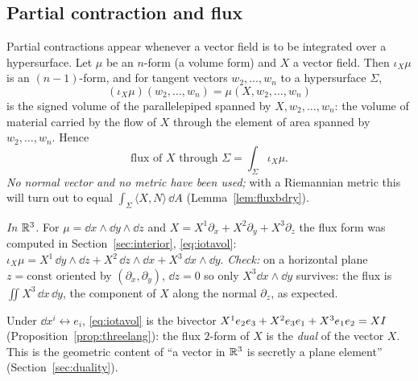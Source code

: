 \subsection{Partial contraction and flux}\label{sec:flux}

Partial contractions appear whenever a vector field is to be integrated over a hypersurface. Let $\mu$ be an $n$-form (\eg a volume form) and $X$ a vector field. Then $\iota_X\mu$ is an $(n-1)$-form, and for tangent vectors $w_2,\dots,w_n$ to a hypersurface $\Sigma$,
\[
(\iota_X\mu)(w_2,\dots,w_n)=\mu(X,w_2,\dots,w_n)
\]
is the signed volume of the parallelepiped spanned by $X,w_2,\dots,w_n$: the volume of material carried by the flow of $X$ through the element of area spanned by $w_2,\dots,w_n$. Hence
\begin{equation}\label{eq:flux}
\text{flux of }X\text{ through }\Sigma=\int_\Sigma\iota_X\mu .
\end{equation}
\emph{No normal vector and no metric have been used;} with a Riemannian metric this will turn out to equal $\int_\Sigma\langle X,N\rangle\,\dd A$ (Lemma~\ref{lem:fluxbdry}).

\emph{In $\mathbb{R}^3$.} For $\mu=\dd x\wedge\dd y\wedge\dd z$ and $X=X^1\partial_x+X^2\partial_y+X^3\partial_z$ the flux form was computed in
Section~\ref{sec:interior}, \eqref{eq:iotavol}: $\iota_X\mu=X^1\,\dd y\wedge\dd z+X^2\,\dd z\wedge\dd x+X^3\,\dd x\wedge\dd y$.
\emph{Check:} on a horizontal plane $z=\mathrm{const}$ oriented by $(\partial_x,\partial_y)$, $\dd z=0$ so only $X^3\dd x\wedge\dd y$ survives: the flux is $\iint X^3\,\dd x\,\dd y$, the component of $X$ along the normal $\partial_z$, as expected.

\begin{synthesis}
Under $\dd x^i\leftrightarrow e_i$, \eqref{eq:iotavol} is the bivector $X^1e_2e_3+X^2e_3e_1+X^3e_1e_2=XI$ (Proposition~\ref{prop:threelang}): the flux $2$-form of $X$ is the \emph{dual} of the vector $X$. This is the geometric content of ``a vector in $\mathbb{R}^3$ is secretly a plane element'' (Section~\ref{sec:duality}).
\end{synthesis}
